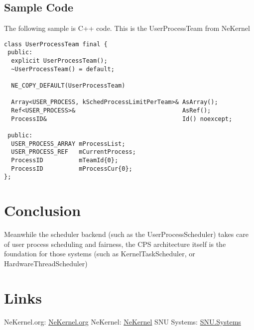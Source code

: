 \documentclass{article}
\begin{document}
\subsection{Sample Code}

{The following sample is C++ code.} {This is the UserProcessTeam from NeKernel}

\begin{verbatim}
class UserProcessTeam final {
 public:
  explicit UserProcessTeam();
  ~UserProcessTeam() = default;

  NE_COPY_DEFAULT(UserProcessTeam)

  Array<USER_PROCESS, kSchedProcessLimitPerTeam>& AsArray();
  Ref<USER_PROCESS>&                              AsRef();
  ProcessID&                                      Id() noexcept;

 public:
  USER_PROCESS_ARRAY mProcessList;
  USER_PROCESS_REF   mCurrentProcess;
  ProcessID          mTeamId{0};
  ProcessID          mProcessCur{0};
};

\end{verbatim}

\section{Conclusion}

{Meanwhile the scheduler backend (such as the UserProcessScheduler) takes care of user process scheduling and fairness, the CPS architecture itself is the foundation for those systems (such as KernelTaskScheduler, or HardwareThreadScheduler)}

\section{Links}

{NeKernel.org}: \href{https://nekernel.org}{NeKernel.org}
\newline
{NeKernel}: \href{https://github.com/nekernel-org/nekernel}{NeKernel}
\newline
{SNU Systems}: \href{https://snu.systems}{SNU.Systems}
\end{document}
